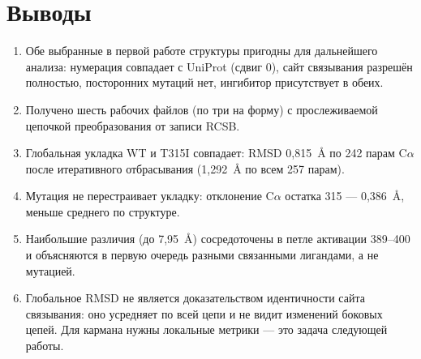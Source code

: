 \documentclass[12pt,a4paper]{article}
\begin{document}
\section{Выводы}

\begin{enumerate}[leftmargin=*,topsep=2pt,itemsep=3pt]
\item Обе выбранные в первой работе структуры пригодны для дальнейшего анализа:
нумерация совпадает с UniProt (сдвиг 0), сайт связывания разрешён полностью,
посторонних мутаций нет, ингибитор присутствует в обеих.
\item Получено шесть рабочих файлов (по три на форму) с прослеживаемой цепочкой
преобразования от записи RCSB.
\item Глобальная укладка WT и T315I совпадает: RMSD 0{,}815~\AA{} по 242 парам
C$\alpha$ после итеративного отбрасывания (1{,}292~\AA{} по всем 257 парам).
\item Мутация не перестраивает укладку: отклонение C$\alpha$ остатка 315 ---
0{,}386~\AA, меньше среднего по структуре.
\item Наибольшие различия (до 7{,}95~\AA) сосредоточены в петле активации 389--400
и объясняются в первую очередь разными связанными лигандами, а не мутацией.
\item Глобальное RMSD не является доказательством идентичности сайта связывания:
оно усредняет по всей цепи и не видит изменений боковых цепей. Для кармана нужны
локальные метрики --- это задача следующей работы.
\end{enumerate}
\end{document}
